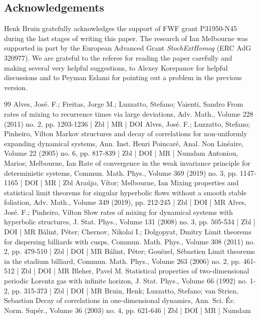 \documentclass[10pt]{amsart}
\theoremstyle{definition}\newtheorem{defi}[theo]{Definition}\newtheorem{rema}[theo]{Remark}\newtheorem{exam}[theo]{Example}\newtheorem{exem}[theo]{Example}\newtheorem{nota}[theo]{Notation}
\begin{document}
\subsection*{Acknowledgements}
Henk Bruin gratefully acknowledges the support of FWF grant P31950-N45 during the last stages of writing this paper. The research of Ian Melbourne was supported in part by the European Advanced Grant \emph{StochExtHomog} (ERC AdG 320977). We are grateful to the referee for reading the paper carefully and making several very helpful suggestions, to Alexey Korepanov for helpful discussions and to Peyman Eslami for pointing out a problem in the previous version.




\begin{thebibliography}{99}
Alves, José. F.; Freitas, Jorge M.; Luzzatto, Stefano; Vaienti, Sandro From rates of mixing to recurrence times via large deviations, Adv. Math., Volume 228 (2011) no. 2, pp. 1203-1236 | Zbl | MR | DOI
Alves, José. F.; Luzzatto, Stefano; Pinheiro, Vilton Markov structures and decay of correlations for non-uniformly expanding dynamical systems, Ann. Inst. Henri Poincaré, Anal. Non Linéaire, Volume 22 (2005) no. 6, pp. 817-839 | Zbl | DOI | MR | Numdam
Antoniou, Marios; Melbourne, Ian Rate of convergence in the weak invariance principle for deterministic systems, Commun. Math. Phys., Volume 369 (2019) no. 3, pp. 1147-1165 | DOI | MR | Zbl
Araújo, Vítor; Melbourne, Ian Mixing properties and statistical limit theorems for singular hyperbolic flows without a smooth stable foliation, Adv. Math., Volume 349 (2019), pp. 212-245 | Zbl | DOI | MR
Alves, José. F.; Pinheiro, Vilton Slow rates of mixing for dynamical systems with hyperbolic structures, J. Stat. Phys., Volume 131 (2008) no. 3, pp. 505-534 | Zbl | DOI | MR
Bálint, Péter; Chernov, Nikolai I.; Dolgopyat, Dmitry Limit theorems for dispersing billiards with cusps, Commun. Math. Phys., Volume 308 (2011) no. 2, pp. 479-510 | Zbl | DOI | MR
Bálint, Péter; Gouëzel, Sébastien Limit theorems in the stadium billiard, Commun. Math. Phys., Volume 263 (2006) no. 2, pp. 461-512 | Zbl | DOI | MR
Bleher, Pavel M. Statistical properties of two-dimensional periodic Lorentz gas with infinite horizon, J. Stat. Phys., Volume 66 (1992) no. 1-2, pp. 315-373 | Zbl | DOI | MR
Bruin, Henk; Luzzatto, Stefano; van Strien, Sebastian Decay of correlations in one-dimensional dynamics, Ann. Sci. Éc. Norm. Supér., Volume 36 (2003) no. 4, pp. 621-646 | Zbl | DOI | MR | Numdam

\end{thebibliography}
\end{document}
